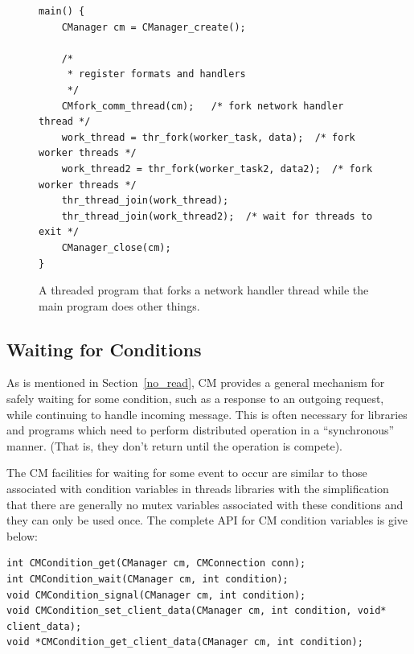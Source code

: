 \documentclass[11pt]{article}
\begin{document}
\begin{figure}
\center\begin{BVerbatim}
main() {
    CManager cm = CManager_create();

    /*
     * register formats and handlers
     */
    CMfork_comm_thread(cm);   /* fork network handler thread */
    work_thread = thr_fork(worker_task, data);  /* fork worker threads */
    work_thread2 = thr_fork(worker_task2, data2);  /* fork worker threads */
    thr_thread_join(work_thread);
    thr_thread_join(work_thread2);  /* wait for threads to exit */
    CManager_close(cm);
}
\end{BVerbatim}
\caption{A threaded program that forks a network handler thread while the
main program does other things.\label{fork_example}\label{last_example}} 
\end{figure}

\subsection{Waiting for Conditions\label{sec:conditions}}

As is mentioned in Section~\ref{no_read}, CM provides a general mechanism
for safely waiting for some condition, such as a response to an outgoing
request, while continuing to handle incoming message.  This is often
necessary for libraries and programs which need to perform distributed
operation in a ``synchronous'' manner.  (That is, they don't return until
the operation is compete).

The CM facilities for waiting for some event to occur are similar
to those associated with condition variables in threads libraries with the
simplification that there are generally no mutex variables associated with
these conditions and they can only be used once.  The complete API for
CM condition variables is give below:

\begin{BVerbatim}
int CMCondition_get(CManager cm, CMConnection conn);
int CMCondition_wait(CManager cm, int condition);
void CMCondition_signal(CManager cm, int condition);
void CMCondition_set_client_data(CManager cm, int condition, void* client_data);
void *CMCondition_get_client_data(CManager cm, int condition);
\end{BVerbatim}
\end{document}

